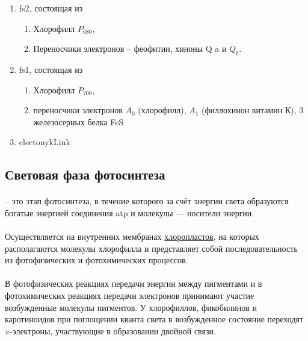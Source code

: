 \begin{enumerate}

	\item \gls{fs2}, состоящая из 

		\begin{enumerate}
			\item Хлорофилл $P_{680}$, 
			\item Переносчики электронов -- феофитин, хиноны Q a и $Q_{b}$. 
		\end{enumerate} 

	\item \gls{fs1}, состоящая из 

		\begin{enumerate}
			\item Хлорофилл $P_{700}$, 
			\item переносчики электронов $A_{0}$ (хлорофилл), $A_{1}$ (филлохинон витамин К), 3 железосерных белка FeS
		\end{enumerate}
	
	\item \gls{electonykLink}
\end{enumerate}


\subsection*{Световая фаза фотосинтеза}

\paragraph*{} -- это этап фотосинтеза, в течение которого за счёт энергии света образуются богатые энергией соединения \gls{atp} и молекулы — носители энергии.

\paragraph*{}Осуществляется на внутренних мембранах \hyperlink{cell_plastids}{хлоропластов}, на которых располагаются молекулы хлорофилла и представляет собой последовательность из фотофизических и фотохимических процессов.

\paragraph*{}В фотофизических реакциях передачи энергии между пигментами и в фотохимических реакциях передачи электронов принимают участие возбужденные молекулы пигментов. У хлорофиллов, фикобилинов и каротиноидов при поглощении кванта света в возбужденное состояние переходят $\pi$-электроны, участвующие в образовании двойной связи.

